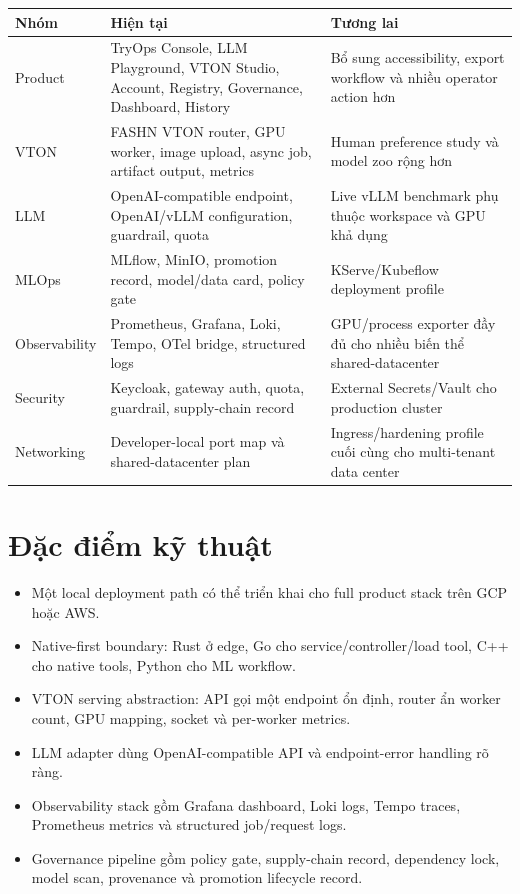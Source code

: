 \documentclass[12pt,a4paper,oneside]{report}
\begin{document}
\begin{longtable}{p{3.0cm}p{5.55cm}p{5.55cm}}
\toprule
\textbf{Nhóm} & \textbf{Hiện tại} & \textbf{Tương lai} \\
\midrule
Product & TryOps Console, LLM Playground, VTON Studio, Account, Registry, Governance, Dashboard, History & Bổ sung accessibility, export workflow và nhiều operator action hơn \\
VTON & FASHN VTON router, GPU worker, image upload, async job, artifact output, metrics & Human preference study và model zoo rộng hơn \\
LLM & OpenAI-compatible endpoint, OpenAI/vLLM configuration, guardrail, quota & Live vLLM benchmark phụ thuộc workspace và GPU khả dụng \\
MLOps & MLflow, MinIO, promotion record, model/data card, policy gate & KServe/Kubeflow deployment profile \\
Observability & Prometheus, Grafana, Loki, Tempo, OTel bridge, structured logs & GPU/process exporter đầy đủ cho nhiều biến thể shared-datacenter \\
Security & Keycloak, gateway auth, quota, guardrail, supply-chain record & External Secrets/Vault cho production cluster \\
Networking & Developer-local port map và shared-datacenter plan & Ingress/hardening profile cuối cùng cho multi-tenant data center \\
\bottomrule
\end{longtable}

\section{Đặc điểm kỹ thuật}

\begin{itemize}
  \item Một local deployment path có thể triển khai cho full product stack trên GCP hoặc AWS.
  \item Native-first boundary: Rust ở edge, Go cho service/controller/load tool, C++ cho native tools, Python cho ML workflow.
  \item VTON serving abstraction: API gọi một endpoint ổn định, router ẩn worker count, GPU mapping, socket và per-worker metrics.
  \item LLM adapter dùng OpenAI-compatible API và endpoint-error handling rõ ràng.
  \item Observability stack gồm Grafana dashboard, Loki logs, Tempo traces, Prometheus metrics và structured job/request logs.
  \item Governance pipeline gồm policy gate, supply-chain record, dependency lock, model scan, provenance và promotion lifecycle record.
\end{itemize}
\end{document}
